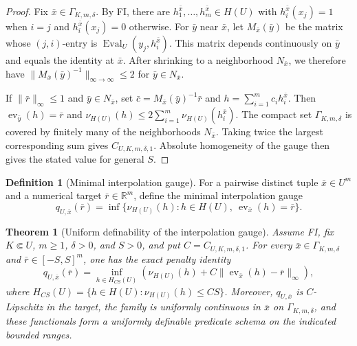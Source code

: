 \documentclass{amsart}
\newtheorem{theorem}{Theorem}[section]
\theoremstyle{definition}
\newtheorem{definition}{Definition}[section]
\theoremstyle{remark}
\numberwithin{equation}{section}
\begin{document}
\begin{proof}
	Fix $\bar x\in\Gamma_{K,m,\delta}$. By FI, there are $h_1^{\bar x},\ldots,h_m^{\bar x}\in H(U)$ with $h_i^{\bar x}(x_j)=1$ when $i=j$ and $h_i^{\bar x}(x_j)=0$ otherwise. For $\bar y$ near $\bar x$, let $M_{\bar x}(\bar y)$ be the matrix whose $(j,i)$-entry is $\operatorname{Eval}_U(y_j,h_i^{\bar x})$. This matrix depends continuously on $\bar y$ and equals the identity at $\bar x$. After shrinking to a neighborhood $N_{\bar x}$, we therefore have $\|M_{\bar x}(\bar y)^{-1}\|_{\infty\to\infty}\le2$ for $\bar y\in N_{\bar x}$.
	
	If $\|\bar r\|_\infty\le1$ and $\bar y\in N_{\bar x}$, set $\bar c=M_{\bar x}(\bar y)^{-1}\bar r$ and $h=\sum_{i=1}^m c_i h_i^{\bar x}$. Then $\operatorname{ev}_{\bar y}(h)=\bar r$ and
	$\nu_{H(U)}(h)\le2\sum_{i=1}^m\nu_{H(U)}(h_i^{\bar x}).$
	The compact set $\Gamma_{K,m,\delta}$ is covered by finitely many of the neighborhoods $N_{\bar x}$. Taking twice the largest corresponding sum gives $C_{U,K,m,\delta,1}$. Absolute homogeneity of the gauge then gives the stated value for general $S$.
\end{proof}

\begin{definition}[Minimal interpolation gauge]
	\label{def:minimal-interpolation-gauge}
	For a pairwise distinct tuple $\bar x\in U^m$ and a numerical target $\bar r\in\mathbb R^m$, define the minimal interpolation gauge
	$$q_{U,\bar x}(\bar r)=\inf\{\nu_{H(U)}(h):h\in H(U),\ \operatorname{ev}_{\bar x}(h)=\bar r\}.$$
\end{definition}

\begin{theorem}[Uniform definability of the interpolation gauge]
	\label{thm:uniform-definability-interpolation-gauge}
	Assume FI, fix $K\Subset U$, $m\ge1$, $\delta>0$, and $S>0$, and put $C=C_{U,K,m,\delta,1}$. For every $\bar x\in\Gamma_{K,m,\delta}$ and $\bar r\in[-S,S]^m$, one has the exact penalty identity
	$$q_{U,\bar x}(\bar r)=\inf_{h\in H_{CS}(U)}\left(\nu_{H(U)}(h)+C\|\operatorname{ev}_{\bar x}(h)-\bar r\|_\infty\right),$$
	where $H_{CS}(U)=\{h\in H(U):\nu_{H(U)}(h)\le CS\}$. Moreover, $q_{U,\bar x}$ is $C$-Lipschitz in the target, the family is uniformly continuous in $\bar x$ on $\Gamma_{K,m,\delta}$, and these functionals form a uniformly definable predicate schema on the indicated bounded ranges.
\end{theorem}
\end{document}
